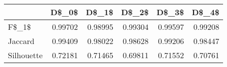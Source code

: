 \begin{table}
\centering
\caption{}
\label{}
\begin{tabular}{lrrrrr}
\toprule
{} &   D\$\_0\$ &   D\$\_1\$ &   D\$\_2\$ &   D\$\_3\$ &   D\$\_4\$ \\
\midrule
F\$\_1\$      & 0.99702 & 0.98995 & 0.99304 & 0.99597 & 0.99208 \\
Jaccard    & 0.99409 & 0.98022 & 0.98628 & 0.99206 & 0.98447 \\
Silhouette & 0.72181 & 0.71465 & 0.69811 & 0.71552 & 0.70761 \\
\bottomrule
\end{tabular}
\end{table}
